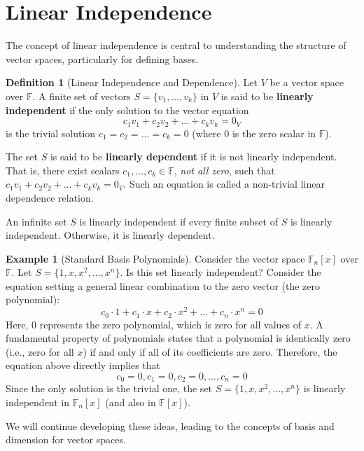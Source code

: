 \documentclass[11pt]{article}
\theoremstyle{definition}
\newtheorem{definition}[theorem]{Definition}
\newtheorem{example}[theorem]{Example}
\newcommand{\F}{\mathbb{F}}
\newcommand{\Fn}[1]{\mathbb{F}_{#1}[x]}
\newcommand{\Fx}{\mathbb{F}[x]}
\begin{document}
\section{Linear Independence}

The concept of linear independence is central to understanding the structure of vector spaces, particularly for defining bases.

\begin{definition}[Linear Independence and Dependence]
Let $V$ be a vector space over $\F$. A finite set of vectors $S = \{v_1, \dots, v_k\}$ in $V$ is said to be \textbf{linearly independent} if the only solution to the vector equation
\[ c_1 v_1 + c_2 v_2 + \dots + c_k v_k = 0_V \]
is the trivial solution $c_1 = c_2 = \dots = c_k = 0$ (where $0$ is the zero scalar in $\F$).

The set $S$ is said to be \textbf{linearly dependent} if it is not linearly independent. That is, there exist scalars $c_1, \dots, c_k \in \F$, \emph{not all zero}, such that $c_1 v_1 + c_2 v_2 + \dots + c_k v_k = 0_V$. Such an equation is called a non-trivial linear dependence relation.

An infinite set $S$ is linearly independent if every finite subset of $S$ is linearly independent. Otherwise, it is linearly dependent.
\end{definition}

\begin{example}[Standard Basis Polynomials]
Consider the vector space $\Fn{n}$ over $\F$. Let $S = \{1, x, x^2, \dots, x^n\}$. Is this set linearly independent?
Consider the equation setting a general linear combination to the zero vector (the zero polynomial):
\[ c_0 \cdot 1 + c_1 \cdot x + c_2 \cdot x^2 + \dots + c_n \cdot x^n = 0 \]
Here, $0$ represents the zero polynomial, which is zero for all values of $x$. A fundamental property of polynomials states that a polynomial is identically zero (i.e., zero for all $x$) if and only if all of its coefficients are zero.
Therefore, the equation above directly implies that
\[ c_0 = 0, c_1 = 0, c_2 = 0, \dots, c_n = 0 \]
Since the only solution is the trivial one, the set $S = \{1, x, x^2, \dots, x^n\}$ is linearly independent in $\Fn{n}$ (and also in $\Fx$).
\end{example}

We will continue developing these ideas, leading to the concepts of basis and dimension for vector spaces.
\end{document}
